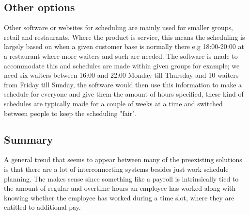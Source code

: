 \subsection{Other options}
Other software or websites for scheduling are mainly used for smaller groups, retail and restaurants. Where the product is service, this means the scheduling is largely based on when a given customer base is normally there e.g 18:00-20:00 at a restaurant where more waiters and such are needed. The software is made to accommodate this and schedules are made within given groups for example; we need six waiters between 16:00 and 22:00 Monday till Thursday and 10 waiters from Friday till Sunday, the software would then use this information to make a schedule for everyone and give them the amount of hours specified, these kind of schedules are typically made for a couple of weeks at a time and switched between people to keep the scheduling "fair".

\subsection{Summary}
A general trend that seems to appear between many of the preexisting solutions is that there are a lot of interconnecting systems besides just work schedule planning. The makes sense since something like a payroll is intrinsically tied to the amount of regular and overtime hours an employee has worked along with knowing whether the employee has worked during a time slot, where they are entitled to additional pay.